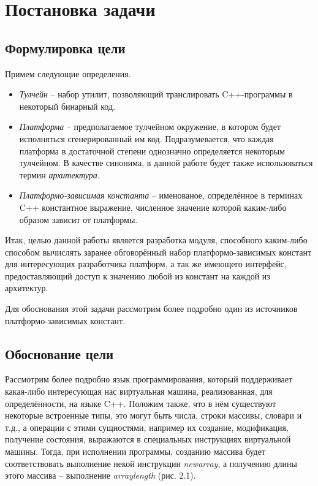 \chapter{Постановка задачи}
\label{sec:Chapter1} 

\section{Формулировка цели}

Примем следующие определения.

\begin{itemize}
    \item
        \textit{Тулчейн} -- набор утилит, позволяющий транслировать C++-программы в некоторый бинарный код.
    \item
        \textit{Платформа} -- предполагаемое тулчейном окружение, в котором будет исполняться сгенерированный им код. Подразумевается, что каждая платформа в достаточной степени однозначно определяется некоторым тулчейном. В качестве синонима, в данной работе будет также использоваться термин \textit{архитектура}.
    \item
        \textit{Платформо-зависимая константа} -- именованое, определённое в терминах C++ константное выражение, численное значение которой каким-либо образом зависит от платформы.
\end{itemize}

Итак, целью данной работы является разработка модуля, способного каким-либо способом вычислять заранее обговорённый набор платформо-зависимых констант для интересующих разработчика платформ, а так же имеющего интерфейс, предоставляющий доступ к значению любой из констант на каждой из архитектур.
\par
Для обоснования этой задачи рассмотрим более подробно один из источников платформо-зависимых констант.
\section{Обоснование цели}
Рассмотрим более подробно язык программирования, который поддерживает какая-либо интересующая нас виртуальная машина, реализованная, для определённости, на языке C++.
Положим также, что в нём существуют некоторые встроенные типы, это могут быть числа, строки массивы, словари и т.д., а операции с этими сущностями, например их создание, модификация, получение состояния, выражаются в специальных инструкциях виртуальной машины.
Тогда, при исполнении программы, созданию массива будет соответствовать выполнение некой инструкции \textit{newarray}, а получению длины этого массива -- выполнение \textit{arraylength} (рис. 2.1).

